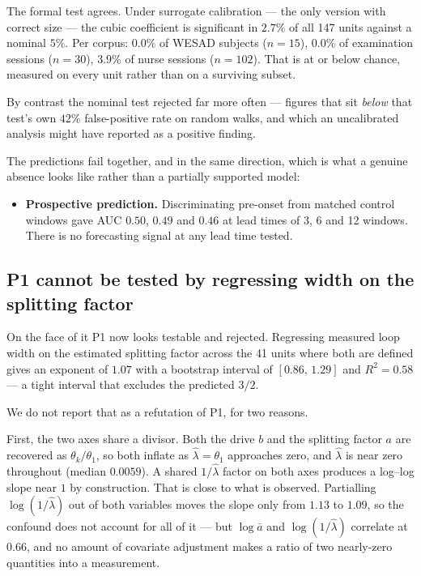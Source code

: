 \documentclass[conference]{IEEEtran}
\begin{document}
The formal test agrees. Under surrogate calibration --- the only version with
correct size --- the cubic coefficient is significant in $2.7\%$ of all 147
units against a nominal $5\%$. Per corpus: $0.0\%$ of WESAD subjects ($n=15$),
$0.0\%$ of examination sessions ($n=30$), $3.9\%$ of nurse sessions ($n=102$).
That is at or below chance, measured on every unit rather than on a surviving
subset.

By contrast the nominal test rejected far more often --- figures that sit
\emph{below} that test's own $42\%$ false-positive rate on random walks, and
which an uncalibrated analysis might have reported as a positive finding.

The predictions fail together, and in the same direction, which is what a
genuine absence looks like rather than a partially supported model:

\begin{itemize}
\item \textbf{Prospective prediction.} Discriminating pre-onset from matched
  control windows gave AUC $0.50$, $0.49$ and $0.46$ at lead times of 3, 6 and
  12 windows. There is no forecasting signal at any lead time tested.
\end{itemize}

\subsection{P1 cannot be tested by regressing width on the splitting factor}
\label{sec:p1-confound}

On the face of it P1 now looks testable and rejected. Regressing measured loop
width on the estimated splitting factor across the 41 units where both are
defined gives an exponent of $1.07$ with a bootstrap interval of
$[0.86,\,1.29]$ and $R^2=0.58$ --- a tight interval that excludes the predicted
$3/2$.

We do not report that as a refutation of P1, for two reasons.

First, the two axes share a divisor. Both the drive $b$ and the splitting
factor $a$ are recovered as $\theta_k/\theta_1$, so both inflate as
$\hat\lambda=\theta_1$ approaches zero, and $\hat\lambda$ is near zero
throughout (median $0.0059$). A shared $1/\hat\lambda$ factor on both axes
produces a log--log slope near $1$ by construction. That is close to what is
observed. Partialling $\log(1/\hat\lambda)$ out of both variables moves the
slope only from $1.13$ to $1.09$, so the confound does not account for all of
it --- but $\log \bar a$ and $\log(1/\hat\lambda)$ correlate at $0.66$, and no
amount of covariate adjustment makes a ratio of two nearly-zero quantities into
a measurement.
\end{document}
